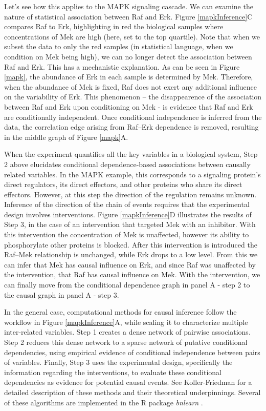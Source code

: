 \documentclass[journal=jacsat,manuscript=article]{achemso}
\begin{document}
Let's see how this applies to the MAPK signaling cascade. We can examine the nature of statistical association between Raf and Erk.  Figure \ref{mapkInference}C compares Raf to Erk, highlighting in red the biological samples where concentrations of Mek are high (here, set to the top quartile).  Note that when we subset the data to only the red samples (in statistical language, when we condition on Mek being high), we can no longer detect the association between Raf and Erk. This has a mechanistic explanation. As can be seen in Figure \ref{mapk}, the abundance of Erk in each sample is determined by Mek. Therefore, when the abundance of Mek is fixed, Raf does not exert any additional influence on the variability of Erk.  This phenomenon -- the disappearence of the association between Raf and Erk upon conditioning on Mek - is evidence that  Raf and Erk are conditionally independent.  Once conditional independence is inferred from the data, the correlation edge arising from Raf--Erk dependence is removed, resulting in the middle graph of Figure \ref{mapk}A.

When the experiment quantifies all the key variables in a biological system, Step 2 above elucidates conditional dependence-based associations between causally related variables. In the MAPK example, this corresponds to a signaling protein's direct regulators, its direct effectors, and other proteins who share its direct effectors.  However, at this step the direction of the regulation remains unknown. Inference of the direction of the chain of events requires that the experimental design involves interventions. Figure \ref{mapkInference}D illustrates the results of Step 3, in the case of an intervention that targeted Mek with an inhibitor. With this intervention the concentration of Mek is unaffected, however its ability to phosphorylate other proteins is blocked.  After this intervention is introduced the Raf--Mek relationship is unchanged, while Erk drops to a low level.  From this we can infer that Mek has causal influence on Erk, and since Raf was unaffected by the intervention, that Raf has causal influence on Mek.  With the intervention, we can finally move from the conditional dependence graph in panel A - step 2 to the causal graph in panel A - step 3.

In the general case, computational methods for causal inference follow the workflow  in Figure \ref{mapkInference}A, while scaling it to characterize multiple inter-related variables. Step 1 creates a dense network of pairwise associations. Step 2 reduces this dense network to a sparse network of putative conditional dependencies, using empirical evidence of  conditional independence between pairs of variables. Finally, Step 3 uses the experimental design, specifically the information regarding the interventions, to evaluate these conditional dependencies as evidence for potential causal events.  See Koller-Friedman \cite{koller2009probabilistic} for a detailed description of these methods and their theoretical underpinnings. Several of these algorithms are implemented in the R package \textit{bnlearn} \cite{scutari2009learning}. 
\end{document}

